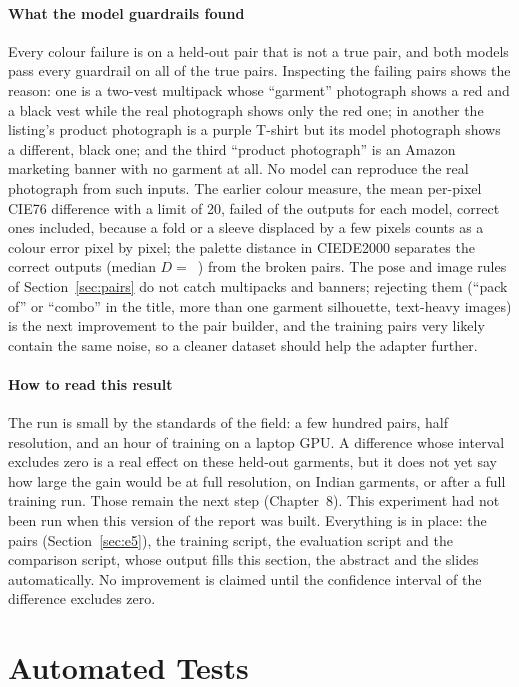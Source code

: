 \paragraph{What the model guardrails found} Every colour failure is on a held-out pair that is not a true pair, and both models pass every guardrail on all of the true pairs. Inspecting the \vGrLoraColour{} failing pairs shows the reason: one is a two-vest multipack whose ``garment'' photograph shows a red and a black vest while the real photograph shows only the red one; in another the listing's product photograph is a purple T-shirt but its model photograph shows a different, black one; and the third ``product photograph'' is an Amazon marketing banner with no garment at all. No model can reproduce the real photograph from such inputs. The earlier colour measure, the mean per-pixel CIE76 difference with a limit of 20, failed \vGrOldFail{} of the \vGrBaseN{} outputs for each model, correct ones included, because a fold or a sleeve displaced by a few pixels counts as a colour error pixel by pixel; the palette distance in CIEDE2000 separates the correct outputs (median $D = $~\vGrGoodMed{}) from the broken pairs. The pose and image rules of Section~\ref{sec:pairs} do not catch multipacks and banners; rejecting them (``pack of'' or ``combo'' in the title, more than one garment silhouette, text-heavy images) is the next improvement to the pair builder, and the training pairs very likely contain the same noise, so a cleaner dataset should help the adapter further.

\paragraph{How to read this result} The run is small by the standards of the field: a few hundred pairs, half resolution, and an hour of training on a laptop GPU. A difference whose interval excludes zero is a real effect on these held-out garments, but it does not yet say how large the gain would be at full resolution, on Indian garments, or after a full training run. Those remain the next step (Chapter~8).
\else
This experiment had not been run when this version of the report was built. Everything is in place: the pairs (Section~\ref{sec:e5}), the training script, the evaluation script and the comparison script, whose output fills this section, the abstract and the slides automatically. No improvement is claimed until the confidence interval of the difference excludes zero.
\fi

\section{Automated Tests}


